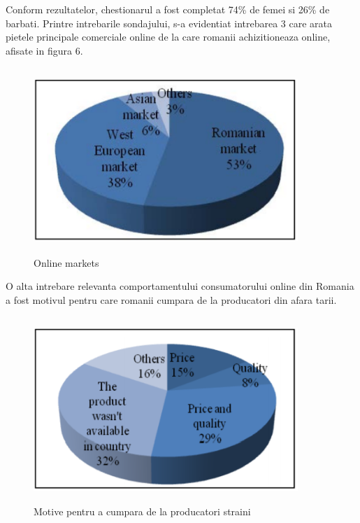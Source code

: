 \documentclass[a4paper, 12pt]{article}
\begin{document}
		\quad Conform rezultatelor, chestionarul a fost completat 74\% de femei si 26\% de barbati. Printre intrebarile sondajului, s-a evidentiat intrebarea 3 care arata pietele principale comerciale online de la care romanii achizitioneaza online, afisate in figura 6. 
		\begin{figure}[!htb]
			\centering
			\includegraphics[width=10cm, height=7cm]{"figures/sixth.png"}
			\caption{Online markets}\label{fig:sixth}
		\end{figure}
	
	\qquad O alta intrebare relevanta comportamentului consumatorului online din Romania a fost motivul pentru care romanii cumpara de la producatori din afara tarii.
	\begin{figure}[!htb]
		\centering
		\includegraphics[width=10cm, height=7cm]{"figures/seventh.png"}
		\caption{Motive pentru a cumpara de la producatori straini}\label{fig:seventh}
	\end{figure}
\end{document}

